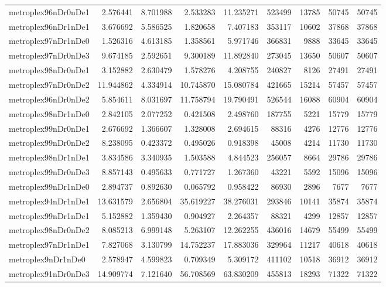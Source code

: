 \begin{longtable}{|l|r|r|r|r|r|r|r|r|}
metroplex96nDr0nDe1 & 2.576441 & 8.701988 & 2.533283 & 11.235271 & 523499 & 13785 & 50745 & 50745 \\
metroplex96nDr1nDe1 & 3.676692 & 5.586525 & 1.820658 & 7.407183 & 353117 & 10602 & 37868 & 37868 \\
metroplex97nDr1nDe0 & 1.526316 & 4.613185 & 1.358561 & 5.971746 & 366831 & 9888 & 33645 & 33645 \\
metroplex97nDr0nDe3 & 9.674185 & 2.592651 & 9.300189 & 11.892840 & 273045 & 13650 & 50607 & 50607 \\
metroplex98nDr0nDe1 & 3.152882 & 2.630479 & 1.578276 & 4.208755 & 240827 & 8126 & 27491 & 27491 \\
metroplex97nDr0nDe2 & 11.944862 & 4.334914 & 10.745870 & 15.080784 & 421665 & 15214 & 57457 & 57457 \\
metroplex96nDr0nDe2 & 5.854611 & 8.031697 & 11.758794 & 19.790491 & 526544 & 16088 & 60904 & 60904 \\
metroplex98nDr1nDe0 & 2.842105 & 2.077252 & 0.421508 & 2.498760 & 187755 & 5221 & 15779 & 15779 \\
metroplex99nDr0nDe1 & 2.676692 & 1.366607 & 1.328008 & 2.694615 & 88316 & 4276 & 12776 & 12776 \\
metroplex99nDr0nDe2 & 8.238095 & 0.423372 & 0.495026 & 0.918398 & 45008 & 4214 & 11730 & 11730 \\
metroplex98nDr1nDe1 & 3.834586 & 3.340935 & 1.503588 & 4.844523 & 256057 & 8664 & 29786 & 29786 \\
metroplex99nDr0nDe3 & 8.857143 & 0.495633 & 0.771727 & 1.267360 & 43221 & 5592 & 15096 & 15096 \\
metroplex99nDr1nDe0 & 2.894737 & 0.892630 & 0.065792 & 0.958422 & 86930 & 2896 & 7677 & 7677 \\
metroplex94nDr1nDe1 & 13.631579 & 2.656804 & 35.619227 & 38.276031 & 293846 & 10141 & 35874 & 35874 \\
metroplex99nDr1nDe1 & 5.152882 & 1.359430 & 0.904927 & 2.264357 & 88321 & 4299 & 12857 & 12857 \\
metroplex98nDr0nDe2 & 8.085213 & 6.999148 & 5.263107 & 12.262255 & 436016 & 14679 & 55499 & 55499 \\
metroplex97nDr1nDe1 & 7.827068 & 3.130799 & 14.752237 & 17.883036 & 329964 & 11217 & 40618 & 40618 \\
metroplex9nDr1nDe0 & 2.578947 & 4.599823 & 0.709349 & 5.309172 & 411102 & 10518 & 36912 & 36912 \\
metroplex91nDr0nDe3 & 14.909774 & 7.121640 & 56.708569 & 63.830209 & 455813 & 18293 & 71322 & 71322 \\

\end{longtable}
